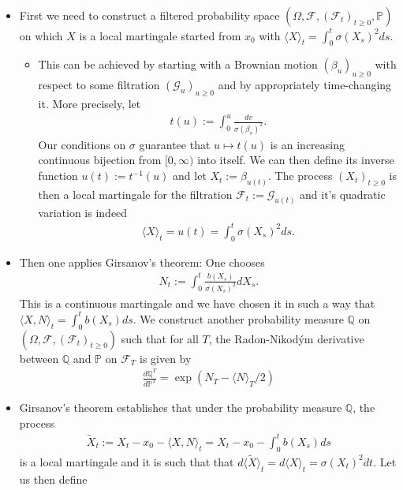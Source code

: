 \documentclass[../mainfile.tex]{subfiles}
\begin{document}
\begin{itemize}
\item First we need to construct a filtered probability space $(\Omega, \mathcal{F}, ( \mathcal{F}_t)_{t \geq 0}, \mathbb{P})$ on which $X$ is a local martingale started from $x_0$ with $\langle X \rangle_t= \int_0^t \sigma (X_s)^2 ds$. 
\begin{itemize}
\item This can be achieved by starting with a Brownian motion $( \beta_u)_{u \geq 0}$ with respect to some filtration $( \mathcal{G}_u)_{u \geq 0}$ and by appropriately time-changing it. More precisely, let 
\begin{align*}
t(u):= \int_0^u \frac{dv}{\sigma( \beta_v)^2}.
\end{align*}
Our conditions on $\sigma$ guarantee that $u \mapsto t(u)$ is an increasing continuous bijection from $[0, \infty)$ into itself. We can then define its inverse function $u(t):=t^{-1}(u)$ and let $X_t:= \beta_{u(t)}$. The process $(X_t)_{t \geq 0}$ is then a local martingale for the filtration $\mathcal{F}_t:= \mathcal{G}_{u(t)}$ and it's quadratic variation is indeed
\begin{align*}
\langle X \rangle_t = u(t)= \int_0^t \sigma(X_s)^2 ds. 
\end{align*} 
\end{itemize}
\item Then one applies Girsanov's theorem: One chooses 
\begin{align*}
N_t:= \int_0^t \frac{b(X_s)}{\sigma(X_s)^2}d X_s.
\end{align*}
This is a continuous martingale and we have chosen it in such a way that $\langle X,N\rangle_t= \int_0^t b(X_s)ds$. We construct another probability measure $\mathbb{Q}$ on $(\Omega, \mathcal{F}, ( \mathcal{F}_t)_{t \geq 0})$ such that for all $T$, the Radon-Nikodým derivative between $\mathbb{Q}$ and $\mathbb{P}$ on $\mathcal{F}_T$ is given by 
\begin{align*}
\frac{d \mathbb{Q}^T}{d \mathbb{P}^T}= \exp(N_T- \langle N \rangle_T/2)
\end{align*}
\newpage
\item Girsanov's theorem establishes that under the probability measure $\mathbb{Q}$, the process 
\begin{align*}
\tilde{X}_t:= X_t-x_0- \langle X,N \rangle_t = X_t-x_0- \int_0^t b(X_s)ds
\end{align*}
is a local martingale and it is such that that $d \langle \tilde{X} \rangle_t = d \langle X \rangle_t = \sigma(X_t)^2dt$. Let us then define 

\end{itemize}
\end{document}
